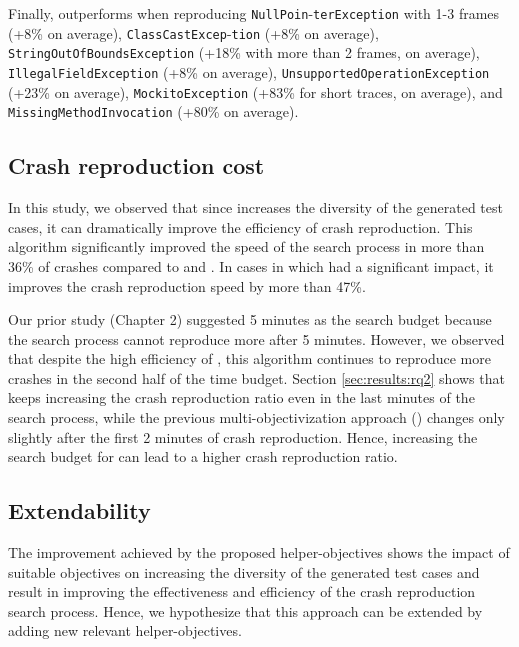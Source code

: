 Finally, \moho outperforms \decomposition when reproducing \texttt{NullPoin}-\texttt{terException} with 1-3 frames (+8\% on average), \texttt{ClassCastExcep}-\texttt{tion} (+8\% on average), \texttt{StringOutOfBoundsException} (+18\% with more than 2 frames, on average), 
\texttt{IllegalFieldException} (+8\% on average),
\texttt{UnsupportedOperationException} (+23\% on average),
\texttt{MockitoException} (+83\% for short traces, on average), and \texttt{MissingMethodInvocation} (+80\% on average).

\subsection{Crash reproduction cost}
In this study, we observed that since \moho increases the diversity of the generated test cases, it can dramatically improve the efficiency of crash reproduction. This algorithm significantly improved the speed of the search process in more than 36\% of crashes compared to \SGGA and \decomposition. In cases in which \moho had a significant impact, it improves the crash reproduction speed by more than 47\%.

Our prior study (Chapter 2) suggested 5 minutes as the search budget because the search process cannot reproduce more after 5 minutes. However, we observed that despite the high efficiency of \moho, this algorithm continues to reproduce more crashes in the second half of the time budget. Section \ref{sec:results:rq2} shows that \moho keeps increasing the crash reproduction ratio even in the last minutes of the search process, while the previous multi-objectivization approach (\decomposition) changes only slightly after the first 2 minutes of crash reproduction. Hence, increasing the search budget for \moho can lead to a higher crash reproduction ratio.


\subsection{Extendability}

The improvement achieved by the proposed helper-objectives shows the impact of suitable objectives on increasing the diversity of the generated test cases and result in improving the effectiveness and efficiency of the crash reproduction search process. Hence, we hypothesize that this approach can be extended by adding new relevant helper-objectives.